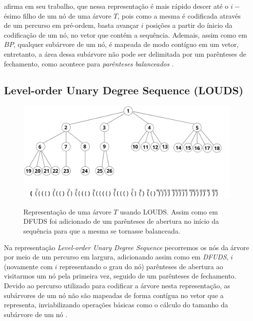 \citet{book-compact-data-structures} afirma em seu trabalho, que nessa representação é mais  rápido descer até o $i-$ésimo filho de um nó de uma árvore $T$, pois como a mesma é codificada através de um percurso em pré-ordem, basta avançar  $i$ posições a partir do ínicio da codificação de um nó, no vetor que contém a sequência. Ademais, assim como em $BP$, qualquer subárvore de um nó, é mapeada de modo contíguo em um vetor, entretanto, a área dessa subárvore não pode ser delimitada por um parênteses de fechamento, como acontece para \textit{parênteses balanceados} \citep{book-compact-data-structures}.

\subsection{Level-order Unary Degree Sequence (LOUDS)}
\begin{figure}[h!]
    \centering
      \caption[Representação de árvores com Level-order Unary Degree Sequence]{Representação de uma árvore $T$ usando LOUDS. 
      Assim como em DFUDS foi adicionado de um parênteses de abertura no início da sequência  para que a mesma se tornasse balanceada.}
      \includegraphics[width=\columnwidth]{images/louds.png}
      \label{fig:louds-representation}
\end{figure}
Na representação \textit{Level-order Unary Degree Sequence} \citep{article-louds,article-dfuds} pecorremos os nós da árvore por meio de um percurso em largura, adicionando assim como em \textit{DFUDS}, $i$ (novamente com $i$ representando o grau do nó) parênteses de abertura ao visitarmos um nó pela primeira vez, seguido de um parênteses de fechamento.
 Devido ao percurso utilizado para codificar a árvore nesta representação, as subárvores de um nó não são mapeadas de forma contígua no vetor que a representa, inviabilizando operações básicas como o cálculo do tamanho da subárvore de um nó \citep{book-compact-data-structures,paper-fully-functinal-succint-trees}.

